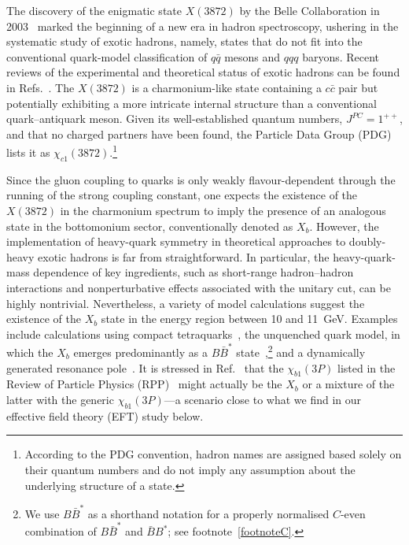 \documentclass[aps,prd,showpacs,amsmath,twocolumn,superscriptaddress,floatfix,nofootinbib,notitlepage]{revtex4-2}
\newcommand{\X}{X(3872)}
\newcommand{\Xb}{X_b}
\newcommand{\gev}{GeV}
\begin{document}
The discovery of the enigmatic state $\X$ by the Belle Collaboration in 2003~\cite{Belle:2003nnu} marked the beginning of a new era in hadron spectroscopy, ushering in the systematic study of exotic hadrons, namely, states that do not fit into the conventional quark-model classification of $q\bar q$ mesons and $qqq$ baryons. Recent reviews of the experimental and theoretical status of exotic hadrons can be found in Refs.~\cite{Ali:2017jda,Guo:2017jvc,Olsen:2017bmm,Albuquerque:2018jkn,Liu:2019zoy,Guo:2019twa,Brambilla:2019esw,Chen:2022asf,Liu:2024uxn,Chen:2024eaq,Wang:2025sic,Dai:2026fkg,Bai:2026atm}. The $\X$ is a charmonium-like state containing a $c\bar{c}$ pair but potentially exhibiting a more intricate internal structure than a conventional quark--antiquark meson. Given its well-established quantum numbers, $J^{PC}=1^{++}$, and that no charged partners have been found, the Particle Data Group (PDG) lists it as $\chi_{c1}(3872)$.\footnote{According to the PDG convention, hadron names are assigned based solely on their quantum numbers and do not imply any assumption about the underlying structure of a state.}

Since the gluon coupling to quarks is only weakly flavour-dependent through the running of the strong coupling constant, one expects the existence of the $\X$ in the charmonium spectrum to imply the presence of an analogous state in the bottomonium sector, conventionally denoted as $\Xb$. However, the implementation of heavy-quark symmetry in theoretical approaches to doubly-heavy exotic hadrons is far from straightforward. In particular, the heavy-quark-mass dependence of key ingredients, such as short-range hadron--hadron interactions and nonperturbative effects associated with the unitary cut, can be highly nontrivial. 
Nevertheless, a variety of model calculations suggest the existence of the $\Xb$ state in the energy region between 10 and 11~\gev. Examples include calculations using compact tetraquarks~\cite{Ebert:2005nc,Ebert:2008se,Ali:2009pi,Matheus:2006xi,Wang:2019mxn}, the unquenched quark model, in which the $\Xb$ emerges predominantly as a $B\bar{B}^*$ state~\cite{Ortega:2021zgk},\footnote{We use $B\bar{B}^*$ as a shorthand notation for a properly normalised $C$-even combination of $B\bar{B}^*$ and $\bar{B}B^*$; see footnote~\ref{footnoteC}.} and a dynamically generated resonance pole~\cite{Zhou:2018hlv}. 
It is stressed in Ref.~\cite{Karliner:2014lta} that the $\chi_{b1}(3P)$ listed in the Review of Particle Physics (RPP)~\cite{ParticleDataGroup:2026mpi} might actually be the $\Xb$ or a mixture of the latter with the generic $\chi_{b1}(3P)$---a scenario close to what we find in our effective field theory (EFT) study below.
\end{document}
